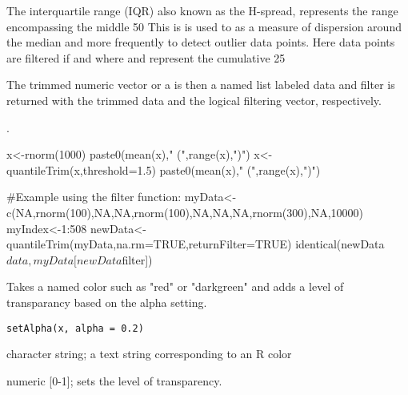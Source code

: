 \documentclass[a4paper]{book}
\begin{document}
%
\begin{Details}\relax
The interquartile range (IQR) also known as the H-spread, represents the range encompassing the middle 50
This is is used to as a measure of dispersion around the median and more frequently to detect outlier data points.
Here data points are filtered if  and  where  and  represent the cumulative 25
\end{Details}
%
\begin{Value}
The trimmed numeric vector or a  is  then a named list labeled data and filter is returned with the trimmed data and the logical filtering vector, respectively.
\end{Value}
%
\begin{SeeAlso}\relax
{}.
\end{SeeAlso}
%
\begin{Examples}
\begin{ExampleCode}
x<-rnorm(1000)
paste0(mean(x)," (",range(x),")")
x<-quantileTrim(x,threshold=1.5)
paste0(mean(x)," (",range(x),")")

#Example using the filter function:
myData<-c(NA,rnorm(100),NA,NA,rnorm(100),NA,NA,NA,rnorm(300),NA,10000)
myIndex<-1:508
newData<-quantileTrim(myData,na.rm=TRUE,returnFilter=TRUE)
identical(newData$data,myData[newData$filter])
\end{ExampleCode}
\end{Examples}
%
\begin{Description}\relax
Takes a named color such as "red" or "darkgreen" and adds a level of transparancy based on the alpha setting.
\end{Description}
%
\begin{Usage}
\begin{verbatim}
setAlpha(x, alpha = 0.2)
\end{verbatim}
\end{Usage}
%
\begin{Arguments}
\begin{ldescription}
\item[\code{x}] character string; a text string corresponding to an R color

\item[\code{alpha}] numeric [0-1]; sets the level of transparency.
\end{ldescription}
\end{Arguments}
\end{document}

